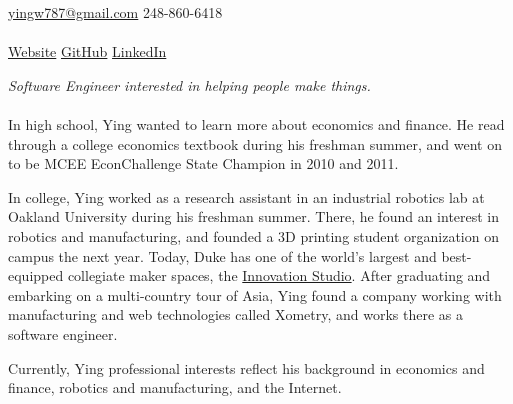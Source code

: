 \documentclass[10pt,a4paper]{article}
\begin{document}
\sloppy  %



\nobreakvspace{0.3em}  %

\noindent\href{mailto:yingw787@gmail.com}{yingw787\mbox{}@\mbox{}gmail.com}\sbull
\textsmaller{}248-860-6418
\\
\\
\href{http://www.yingw787.com}{Website}\sbull
\href{http://www.github.com/yingw787}{GitHub}\sbull
\href{http://www.linkedin.com/in/yingw787}{LinkedIn}

\spacedhrule{0.9em}{-0.4em}  %


\vspace{-1.3em}  %
\begin{multicols}{2}  %
\noindent \emph{Software Engineer interested in helping people make things.}
\\
\\
In high school, Ying wanted to learn more about economics and finance. He read through a college economics textbook during his freshman summer, and went on to be MCEE EconChallenge State Champion in 2010 and 2011.

In college, Ying worked as a research assistant in an industrial robotics lab at Oakland University during his freshman summer. There, he found an interest in robotics and manufacturing, and founded a 3D printing student organization on campus the next year. Today, Duke has one of the world's largest and best-equipped collegiate maker spaces, the \href{https://colab.duke.edu/studio}{Innovation Studio}. After graduating and embarking on a multi-country tour of Asia, Ying found a company working with manufacturing and web technologies called Xometry, and works there as a software engineer.

Currently, Ying professional interests reflect his background in economics and finance, robotics and manufacturing, and the Internet.
\end{multicols}
\end{document}
